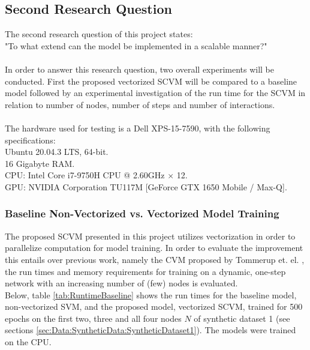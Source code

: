 \subsection{Second Research Question}
\label{sec:ResearchQuestion2}
The second research question of this project states:
\\
"To what extend can the model be implemented in a scalable manner?"
\\\\
In order to answer this research question, two overall experiments will be conducted.
First the proposed vectorized SCVM will be compared to a baseline model followed by an experimental investigation of the run time for the SCVM in relation to number of nodes, number of steps and number of interactions.
\\\\
The hardware used for testing is a Dell XPS-15-7590, with the following specifications:
\\
Ubuntu 20.04.3 LTS, 64-bit.
\\
16 Gigabyte RAM.
\\
CPU: Intel Core i7-9750H CPU @ 2.60GHz × 12.
\\
GPU: NVIDIA Corporation TU117M [GeForce GTX 1650 Mobile / Max-Q].


\subsubsection{Baseline Non-Vectorized vs. Vectorized Model Training}
\label{sec:ResearchQuestion2:BaselineComparison}
The proposed SCVM presented in this project utilizes vectorization in order to parallelize computation for model training.
In order to evaluate the improvement this entails over previous work, namely the CVM proposed by Tommerup et. el. \cite{Tommerup2021LearningNetworks}, the run times and memory requirements for training on a dynamic, one-step network with an increasing number of (few) nodes is evaluated.
\\
\noindent
Below, table \ref{tab:RuntimeBaseline} shows the run times for the baseline model, non-vectorized SVM, and the proposed model, vectorized SCVM, trained for 500 epochs on the first two, three and all four nodes $N$ of synthetic dataset 1 (see sections \ref{sec:Data:SyntheticData:SyntheticDataset1}).
The models were trained on the CPU.

